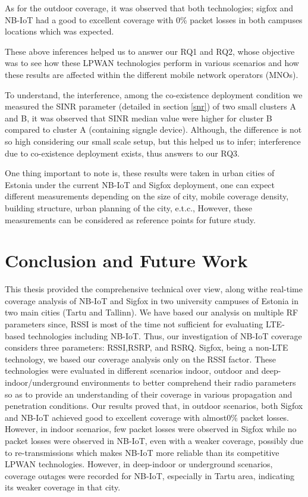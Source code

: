 \documentclass[12pt]{article}
\begin{document}
As for the outdoor coverage, it was observed that both technologies; sigfox and NB-IoT had a good to excellent coverage with 0\% packet losses in both campuses locations which was expected.\par
These above inferences helped us to answer our RQ1 and RQ2, whose objective was to see how these LPWAN technologies perform in various scenarios and how these results are affected within the different mobile network operators (MNOs).

To understand, the interference, among the co-existence deployment condition we measured the SINR parameter (detailed in section \ref{snr}) of two small clusters A and B, it was observed that SINR median value were higher for cluster B compared to cluster A (containing signgle device). Although, the difference is not so high considering our small scale setup, but this helped us to infer; interference due to co-existence deployment exists, thus answers to our RQ3. 

One thing important to note is, these results were taken in urban cities of Estonia under the current NB-IoT and Sigfox deployment, one can expect different measurements depending on the size of city, mobile coverage density, building structure, urban planning of the city, e.t.c., However, these measurements can be considered as reference points for future study.
\newpage
\section{Conclusion and Future Work} \label{conclusion}
 
This thesis provided the comprehensive technical over view, along withe real-time coverage analysis of NB-IoT and Sigfox in two university campuses of Estonia in two main cities (Tartu and Tallinn). We have based our analysis on multiple RF parameters since, RSSI is most of the time not sufficient for evaluating LTE-based technologies including NB-IoT. Thus, our investigation of NB-IoT coverage considers three parameters:  RSSI,RSRP, and RSRQ. Sigfox, being a non-LTE technology, we based our coverage analysis only on the RSSI factor. These technologies were evaluated in different scenarios indoor, outdoor and deep-indoor/underground environments to better comprehend their radio parameters so as to provide an understanding of their coverage in various propagation and penetration conditions. Our results proved that, in outdoor scenarios, both Sigfox and NB-IoT achieved good to excellent coverage with almost0\% packet losses. However, in indoor scenarios, few packet losses were observed in Sigfox while no packet losses were observed in NB-IoT, even with a weaker coverage, possibly due to re-transmissions which makes NB-IoT more reliable than its competitive LPWAN technologies. However, in deep-indoor or underground scenarios, coverage outages were recorded for NB-IoT, especially in Tartu area, indicating its weaker coverage in that city.\par
\end{document}
